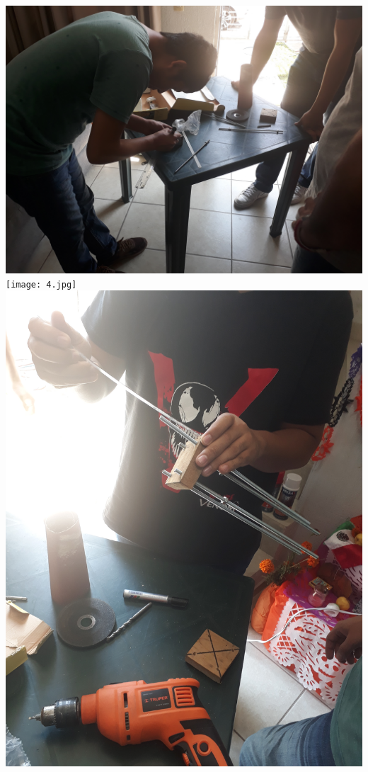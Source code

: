 \documentclass[11pt,a4paper,oldfontcommands,oneside]{memoir}
\begin{document}
\begin{center}
\includegraphics[scale=0.05]{3.jpg} \\
\texttt{[image: 4.jpg]} \\
\includegraphics[scale=0.05]{5.jpg} \\

\end{center}
\end{document}
